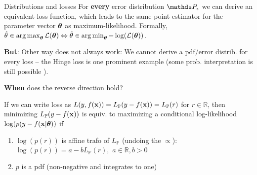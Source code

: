 \documentclass[11pt,compress,t,notes=noshow, xcolor=table]{beamer}
\begin{document}
\begin{vbframe}{Distributions and losses}
For \textbf{every} error distribution $\P_\eps$ we can derive an equivalent loss function, which leads to the same point estimator for the parameter vector $\bm{\theta}$ as maximum-likelihood. Formally, $\hat{\theta} \in \operatorname*{arg\,max}_{\bm{\theta}} \mathcal{L}(\bm{\theta}) \Leftrightarrow \hat{\theta} \in \operatorname*{arg\,min}_{\bm{\theta}}-\log(\mathcal{L}(\bm{\theta}))$.  %
    
\vspace{0.2cm}    
\textbf{But}: Other way does not always work: We cannot derive a pdf/error distrib. for every loss -- the Hinge loss is one prominent example (some prob. interpretation is still possible ).

\vspace{0.2cm}
\textbf{When} does the reverse direction hold?

If we can write loss as $L(y,f(\mathbf{x}))=L_{\mathbb{P}}(y-f(\mathbf{x}))=L_{\mathbb{P}}(r)$ for $r \in \mathbb{R}$, then minimizing $L_{\mathbb{P}}(y-f(\mathbf{x}))$ is equiv. to maximizing a conditional log-likelihood $\log(p(y-f(\mathbf{x}|\bm{\theta}))$ if
\begin{enumerate}
 \setlength{\itemsep}{1.0em}
    \item $\log(p(r))$ is affine trafo of $L_{\mathbb{P}}$ (undoing the $\propto$):
    $\log(p(r)) = a - bL_{\mathbb{P}}(r),\,\,a \in \mathbb{R}, b>0$
    \item  $p$ is a pdf (non-negative and integrates to one)
\end{enumerate}

\end{vbframe}


\endlecture
\end{document}
